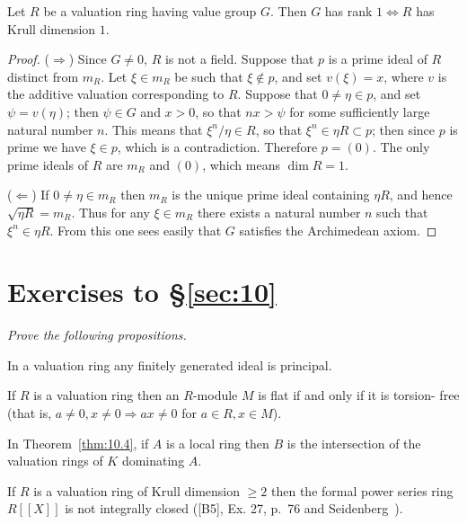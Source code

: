 \begin{theorem}\label{thm:10.7}
Let $R$ be a valuation ring having value group $G$. Then $G$ has
rank $1 \iff R$ has Krull dimension $1$.
\end{theorem}

\begin{proof}
($\Rightarrow$) Since $G \neq 0$, $R$ is not a field. Suppose that $p$ is a prime ideal of $R$
distinct from $m_R$. Let $\xi \in m_R$ be such that $\xi \notin p$, and set $v(\xi) = x$, where $v$ is the
additive valuation corresponding to $R$. Suppose that $0 \neq \eta \in p$, and set $\psi =
v(\eta)$; then $\psi \in G$ and $x > 0$, so that $nx > \psi$ for some sufficiently large natural
number $n$. This means that $\xi^n/\eta \in R$, so that $\xi^n \in \eta R \subset p$; then since $p$ is prime
we have $\xi \in p$, which is a contradiction. Therefore $p = (0)$. The only prime
ideals of $R$ are $m_R$ and $(0)$, which means $\dim R = 1$.

($\Leftarrow$) If $0 \neq \eta \in m_R$ then $m_R$ is the unique prime ideal containing $\eta R$, and
hence $\sqrt{\eta R} = m_R$. Thus for any $\xi \in m_R$ there exists a natural number $n$ such
that $\xi^n \in \eta R$. From this one sees easily that $G$ satisfies the Archimedean
axiom.
\end{proof}

\section*{Exercises to \S\ref{sec:10}}
\emph{Prove the following propositions.}

\begin{exercise}\label{ex:10.1-ex}
In a valuation ring any finitely generated ideal is principal.
\end{exercise}

\begin{exercise}\label{ex:10.2-ex}
If $R$ is a valuation ring then an $R$-module $M$ is flat if and only if it is torsion-
free (that is, $a \neq 0, x \neq 0 \Rightarrow ax \neq 0$ for $a \in R, x \in M$).
\end{exercise}

\begin{exercise}\label{ex:10.3-ex}
In Theorem~\ref{thm:10.4}, if $A$ is a local ring then $B$ is the intersection of the
valuation rings of $K$ dominating $A$.
\end{exercise}

\begin{exercise}\label{ex:10.4-ex}
If $R$ is a valuation ring of Krull dimension $\ge 2$ then the formal power series
ring $R[[X]]$ is not integrally closed ([B5], Ex. 27, p.~76 and Seidenberg~\cite{Sd1}).
\end{exercise}


